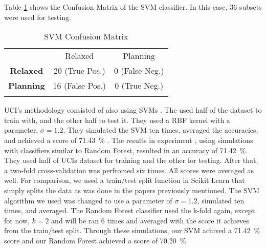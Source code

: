 \documentclass[conference,compsoc]{IEEEtran}
\begin{document}
Table \ref{table5} shows the Confusion Matrix of the SVM classifier. In this case, $36$ subsets were used for testing.
\begin{table}
\centering
\caption{SVM Confusion Matrix}
\label{table5}
\begin{tabularx}{.7\textwidth}{>{\bfseries} c | c c | }
& Relaxed & \multicolumn{1}{c}{Planning}\\
\hhline{---}
Relaxed & 20 (True Pos.) \cellcolor[gray]{.8}& 0 (False Neg.) \\ 
Planning & 16 (False Pos.) & 0 (True Neg.) \cellcolor[gray]{.8} \\
\hhline{~--}
\end{tabularx}

\end{table}

UCI's methodology consisted of also using SVMs \cite{classsvm}. The used half of the dataset to train with, and the other half to test it. 
They used a RBF kernel with a parameter, $\sigma = 1.2$. They simulated the SVM ten times, averaged the accuracies, and achieved a score of \SI{71.43}{\percent} \cite{classsvm}.
The results in experiment \cite{fuzzy}, using simulations with classifiers similar to Random Forest, resulted in an accuracy of \SI{71.42}{\percent}. They used half of UCIs dataset for training and the other for testing. After that, a two-fold cross-validation was perfromed six times. All scores were averaged as well.  For comparison, we used a train/test split function in Scikit Learn that simply splits the data as was done in the papers previously mentioned. The SVM algorithm we used 
was changed to use a parameter of $\sigma = 1.2$, simulated ten times, and averaged. The Random Forest classifier used the k-fold again, except for now, $k = 2$ and will be 
ran 6 times and averaged with the score it achieves from the train/test split. Through these simulations, our SVM achived a \SI{71.42}{\percent} score and our 
Random Forest achieved a score of \SI{70.20}{\percent}.
\end{document}
